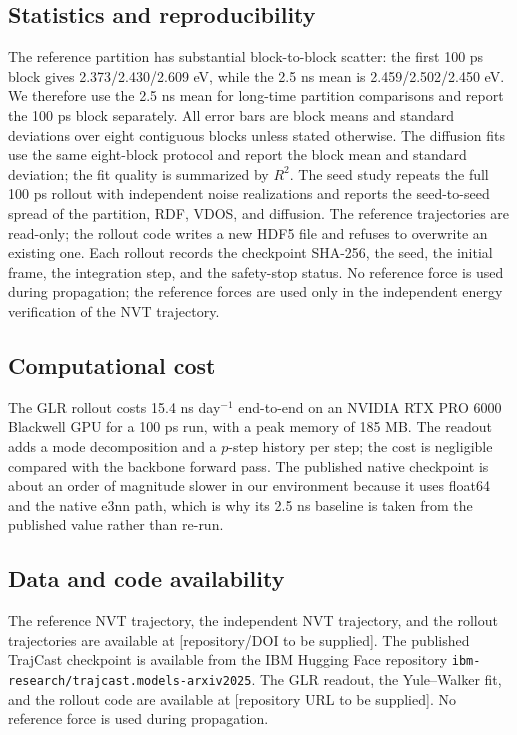 \subsection{Statistics and reproducibility}

The reference partition has substantial block-to-block scatter: the first 100 ps block gives
2.373/2.430/2.609 eV, while the 2.5 ns mean is 2.459/2.502/2.450 eV. We therefore use the 2.5 ns
mean for long-time partition comparisons and report the 100 ps block separately. All error bars
are block means and standard deviations over eight contiguous blocks unless stated otherwise. The
diffusion fits use the same eight-block protocol and report the block mean and standard
deviation; the fit quality is summarized by \(R^2\). The seed study repeats the full 100 ps
rollout with independent noise realizations and reports the seed-to-seed spread of the partition,
RDF, VDOS, and diffusion. The reference trajectories are read-only; the rollout code writes a new
HDF5 file and refuses to overwrite an existing one. Each rollout records the checkpoint SHA-256,
the seed, the initial frame, the integration step, and the safety-stop status. No reference force
is used during propagation; the reference forces are used only in the independent energy
verification of the NVT trajectory.

\subsection{Computational cost}

The GLR rollout costs 15.4 ns day\(^{-1}\) end-to-end on an NVIDIA RTX PRO 6000 Blackwell GPU for
a 100 ps run, with a peak memory of 185 MB. The readout adds a mode decomposition and a \(p\)-step
history per step; the cost is negligible compared with the backbone forward pass. The published
native checkpoint is about an order of magnitude slower in our environment because it uses
float64 and the native e3nn path, which is why its 2.5 ns baseline is taken from the published
value rather than re-run.

\subsection{Data and code availability}

The reference NVT trajectory, the independent NVT trajectory, and the rollout trajectories are
available at [repository/DOI to be supplied]. The published TrajCast checkpoint is available from
the IBM Hugging Face repository \texttt{ibm-research/trajcast.models-arxiv2025}. The GLR readout,
the Yule--Walker fit, and the rollout code are available at [repository URL to be supplied]. No
reference force is used during propagation.
